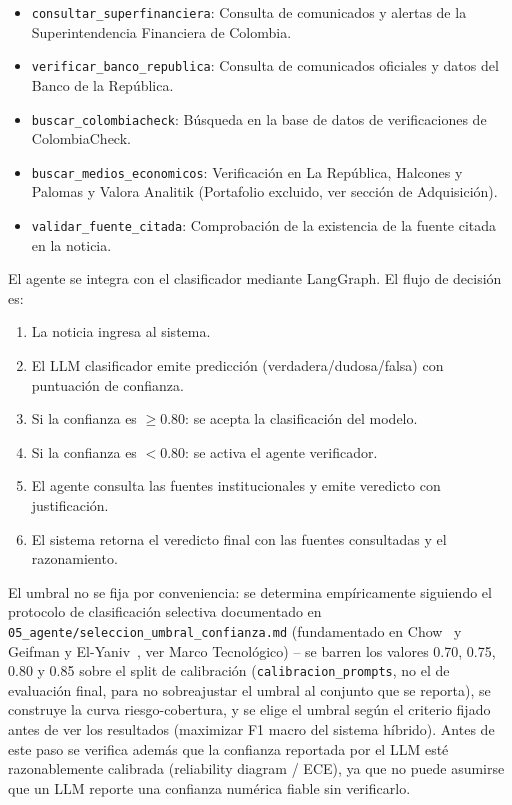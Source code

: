 \begin{itemize}
    \item \texttt{consultar\_superfinanciera}: Consulta de comunicados y alertas de la Superintendencia Financiera de Colombia.
    \item \texttt{verificar\_banco\_republica}: Consulta de comunicados oficiales y datos del Banco de la República.
    \item \texttt{buscar\_colombiacheck}: Búsqueda en la base de datos de verificaciones de ColombiaCheck.
    \item \texttt{buscar\_medios\_economicos}: Verificación en La República, Halcones y Palomas y Valora Analitik (Portafolio excluido, ver sección de Adquisición).
    \item \texttt{validar\_fuente\_citada}: Comprobación de la existencia de la fuente citada en la noticia.
\end{itemize}

El agente se integra con el clasificador mediante LangGraph. El flujo de decisión es:

\begin{enumerate}
    \item La noticia ingresa al sistema.
    \item El LLM clasificador emite predicción (verdadera/dudosa/falsa) con puntuación de confianza.
    \item Si la confianza es $\geq 0.80$: se acepta la clasificación del modelo.
    \item Si la confianza es $< 0.80$: se activa el agente verificador.
    \item El agente consulta las fuentes institucionales y emite veredicto con justificación.
    \item El sistema retorna el veredicto final con las fuentes consultadas y el razonamiento.
\end{enumerate}

El umbral no se fija por conveniencia: se determina empíricamente siguiendo el protocolo de clasificación selectiva documentado en \texttt{05\_agente/seleccion\_umbral\_confianza.md} (fundamentado en Chow~\cite{Chow1970} y Geifman y El-Yaniv~\cite{GeifmanElYaniv2017}, ver Marco Tecnológico) -- se barren los valores 0.70, 0.75, 0.80 y 0.85 sobre el split de calibración (\texttt{calibracion\_prompts}, no el de evaluación final, para no sobreajustar el umbral al conjunto que se reporta), se construye la curva riesgo-cobertura, y se elige el umbral según el criterio fijado antes de ver los resultados (maximizar F1 macro del sistema híbrido). Antes de este paso se verifica además que la confianza reportada por el LLM esté razonablemente calibrada (reliability diagram / ECE), ya que no puede asumirse que un LLM reporte una confianza numérica fiable sin verificarlo.

